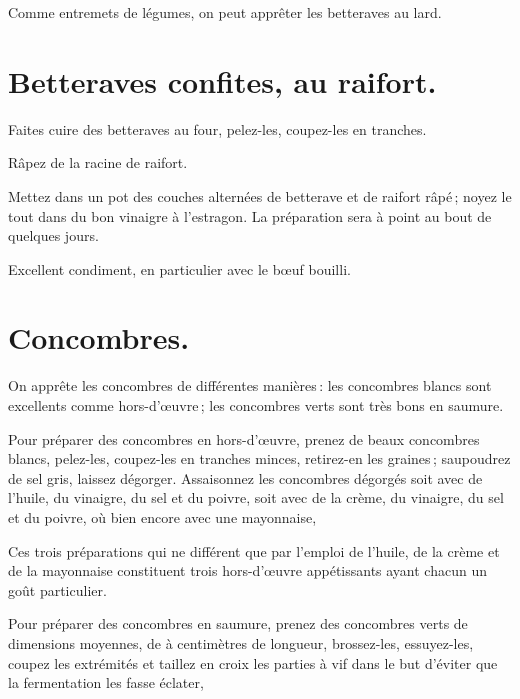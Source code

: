 \sk

Comme entremets de légumes, on peut apprêter les betteraves au lard.

\section*{\centering Betteraves confites, au raifort.}
{}

Faites cuire des betteraves au four, pelez-les, coupez-les en tranches.

Râpez de la racine de raifort.

Mettez dans un pot des couches alternées de betterave et de raifort râpé ;
noyez le tout dans du bon vinaigre à l’estragon. La préparation sera à point au
bout de quelques jours.

Excellent condiment, en particulier avec le bœuf bouilli.

\section*{\centering Concombres.}
{}

On apprête les concombres de différentes manières : les concombres blancs sont
excellents comme hors-d'œuvre ; les concombres verts sont très bons en saumure.

\sk

Pour préparer des concombres en hors-d'œuvre, prenez de beaux concombres
blancs, pelez-les, coupez-les en tranches minces, retirez-en les graines ;
saupoudrez de sel gris, laissez dégorger. Assaisonnez les concombres dégorgés
soit avec de l'huile, du vinaigre, du sel et du poivre, soit avec de la crème,
du vinaigre, du sel et du poivre, où bien encore avec une mayonnaise,

Ces trois préparations qui ne différent que par l'emploi de l'huile, de la
crème et de la mayonnaise constituent trois hors-d'œuvre appétissants ayant
chacun un goût particulier.

\sk

Pour préparer des concombres en saumure, prenez des concombres verts de
dimensions moyennes, de {\mmm} à {\mmm} centimètres de longueur,
brossez-les, essuyez-les, coupez les extrémités et taillez en croix les parties
à vif dans le but d'éviter que la fermentation les fasse éclater,

